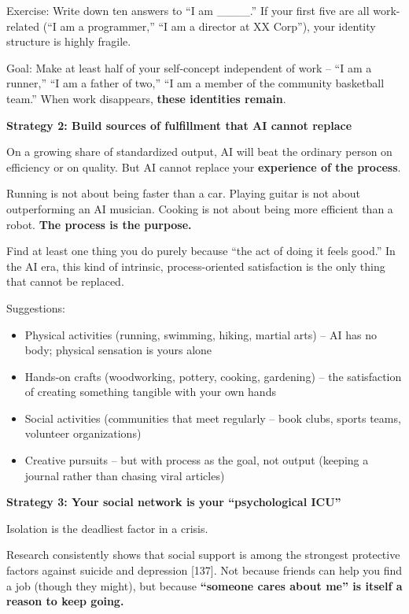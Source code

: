 \documentclass[11pt,a4paper]{article}
\begin{document}
Exercise: Write down ten answers to ``I am \_\_\_\_.'' If your first five are all work-related (``I am a programmer,'' ``I am a director at XX Corp''), your identity structure is highly fragile.

Goal: Make at least half of your self-concept independent of work -- ``I am a runner,'' ``I am a father of two,'' ``I am a member of the community basketball team.'' When work disappears, \textbf{these identities remain}.

\textbf{Strategy 2: Build sources of fulfillment that AI cannot replace}

On a growing share of standardized output, AI will beat the ordinary person on efficiency or on quality. But AI cannot replace your \textbf{experience of the process}.

Running is not about being faster than a car. Playing guitar is not about outperforming an AI musician. Cooking is not about being more efficient than a robot. \textbf{The process is the purpose.}

Find at least one thing you do purely because ``the act of doing it feels good.'' In the AI era, this kind of intrinsic, process-oriented satisfaction is the only thing that cannot be replaced.

Suggestions:

\begin{itemize}
  \item Physical activities (running, swimming, hiking, martial arts) -- AI has no body; physical sensation is yours alone
  \item Hands-on crafts (woodworking, pottery, cooking, gardening) -- the satisfaction of creating something tangible with your own hands
  \item Social activities (communities that meet regularly -- book clubs, sports teams, volunteer organizations)
  \item Creative pursuits -- but with process as the goal, not output (keeping a journal rather than chasing viral articles)
\end{itemize}

\textbf{Strategy 3: Your social network is your ``psychological ICU''}

Isolation is the deadliest factor in a crisis.

Research consistently shows that social support is among the strongest protective factors against suicide and depression [137]. Not because friends can help you find a job (though they might), but because \textbf{``someone cares about me'' is itself a reason to keep going.}
\end{document}
